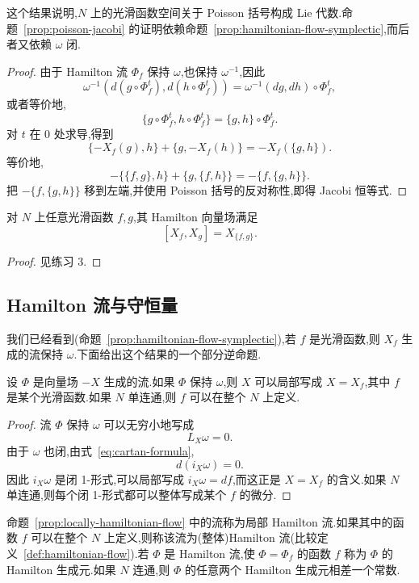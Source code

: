 这个结果说明,$N$ 上的光滑函数空间关于 Poisson 括号构成 Lie 代数.命题~\ref{prop:poisson-jacobi} 的证明依赖命题~\ref{prop:hamiltonian-flow-symplectic},而后者又依赖 $\omega$ 闭.

\begin{proof}
由于 Hamilton 流 $\Phi_f$ 保持 $\omega$,也保持 $\omega^{-1}$,因此
\[
 \omega^{-1}(d(g\circ\Phi_f^t),d(h\circ\Phi_f^t))
 =\omega^{-1}(dg,dh)\circ\Phi_f^t,
\]
或者等价地,
\[
 \{g\circ\Phi_f^t,h\circ\Phi_f^t\}
 =\{g,h\}\circ\Phi_f^t.
\]
对 $t$ 在 $0$ 处求导,得到
\[
 \{-X_f(g),h\}+\{g,-X_f(h)\}
 =-X_f(\{g,h\}).
\]
等价地,
\[
 -\{\{f,g\},h\}+\{g,\{f,h\}\}
 =-\{f,\{g,h\}\}.
\]
把 $-\{f,\{g,h\}\}$ 移到左端,并使用 Poisson 括号的反对称性,即得 Jacobi 恒等式.
\end{proof}

\begin{proposition}\label{prop:hamiltonian-vector-field-bracket}
对 $N$ 上任意光滑函数 $f,g$,其 Hamilton 向量场满足
\[
 [X_f,X_g]=X_{\{f,g\}}.
\]
\end{proposition}

\begin{proof}
见练习 3.
\end{proof}

\subsection{Hamilton 流与守恒量}
\label{subsec:hamiltonian-flows-conserved}

我们已经看到(命题~\ref{prop:hamiltonian-flow-symplectic}),若 $f$ 是光滑函数,则 $X_f$ 生成的流保持 $\omega$.下面给出这个结果的一个部分逆命题.

\begin{proposition}[局部 Hamilton 流]\label{prop:locally-hamiltonian-flow}
设 $\Phi$ 是向量场 $-X$ 生成的流.如果 $\Phi$ 保持 $\omega$,则 $X$ 可以局部写成 $X=X_f$,其中 $f$ 是某个光滑函数.如果 $N$ 单连通,则 $f$ 可以在整个 $N$ 上定义.
\end{proposition}

\begin{proof}
流 $\Phi$ 保持 $\omega$ 可以无穷小地写成
\[
 L_X\omega=0.
\]
由于 $\omega$ 也闭,由式~\eqref{eq:cartan-formula},
\[
 d(i_X\omega)=0.
\]
因此 $i_X\omega$ 是闭 1-形式,可以局部写成 $i_X\omega=df$,而这正是 $X=X_f$ 的含义.如果 $N$ 单连通,则每个闭 1-形式都可以整体写成某个 $f$ 的微分.
\end{proof}

命题~\ref{prop:locally-hamiltonian-flow} 中的流称为局部 Hamilton 流.如果其中的函数 $f$ 可以在整个 $N$ 上定义,则称该流为(整体)Hamilton 流(比较定义~\ref{def:hamiltonian-flow}).若 $\Phi$ 是 Hamilton 流,使 $\Phi=\Phi_f$ 的函数 $f$ 称为 $\Phi$ 的 Hamilton 生成元.如果 $N$ 连通,则 $\Phi$ 的任意两个 Hamilton 生成元相差一个常数.

